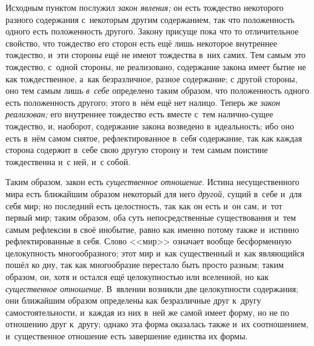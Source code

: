 Исходным пунктом послужил {\em закон явления;} он есть
тождество некоторого разного содержания с~некоторым другим содержанием, так
что положенность одного есть положенность другого. Закону присуще пока что
то отличительное свойство, что тождество его сторон есть ещё лишь некоторое
внутреннее тождество, и~эти стороны ещё не имеют тождества в~них самих. Тем
самым это тождество, с~одной стороны, не реализовано, содержание закона
имеет бытие не как тождественное, а~как безразличное, разное содержание; с
другой стороны, оно тем самым лишь {\em в~себе}
определено таким образом, что положенность одного есть положенность
другого; этого в~нём ещё нет налицо. Теперь же
{\em закон реализован;} его внутреннее тождество есть
вместе с~тем налично-сущее тождество, и, наоборот, содержание закона
возведено в~идеальность; ибо оно есть в~нём самом снятое, рефлектированное
в~себя содержание, так как каждая сторона содержит в~себе свою другую
сторону и~тем самым поистине тождественна и~с ней, и~с собой.

Таким образом, закон есть {\em существенное отношение}.
Истина несущественного мира есть ближайшим образом некоторый для него
{\em другой,} сущий в~себе и~для себя мир; но последний
есть целостность, так как он есть и~он сам, и~тот первый мир; таким
образом, оба суть непосредственные существования и~тем самым рефлексии в
своё инобытие, равно как именно потому также и~истинно рефлектированные в
себя. Слово <<мир>> означает вообще бесформенную целокупность многообразного;
этот мир и~как существенный и~как являющийся пошёл ко дну, так как
многообразие перестало быть просто разным; таким образом, он, хотя и
остался ещё целокупностью или вселенной, но как
{\em существенное отношение}. В~явлении возникли две
целокупности содержания; они ближайшим образом определены как безразличные
друг к~другу самостоятельности, и~каждая из них в~ней же самой имеет форму,
но не по отношению друг к~другу; однако эта форма оказалась также и~их
соотношением, и~существенное отношение есть завершение единства их формы.

